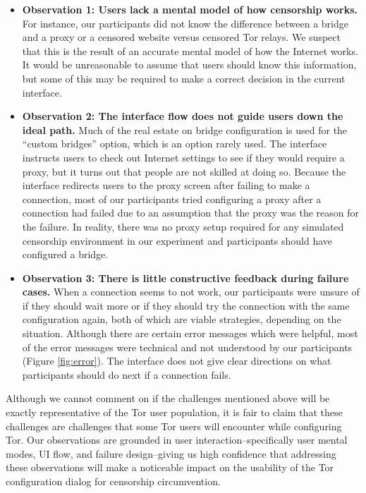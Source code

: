 \documentclass{template}
\begin{document}
\begin{itemize} \itemsep1pt \parskip0pt 
\item {\bfseries Observation 1: Users lack a mental model of how censorship works.} For instance, our participants did not know the difference between a bridge and a proxy or a censored website versus censored Tor relays. We suspect that this is the result of an accurate mental model of how the Internet works.  It would be unreasonable to assume that users should know this information, but some of this may be required to make a correct decision in the current interface. 
\item {\bfseries Observation 2: The interface flow does not guide users down the ideal path.} Much of the real estate on bridge configuration is used for the ``custom bridges'' option, which is an option rarely used. The interface instructs users to check out Internet settings to see if they would require a proxy, but it turns out that people are not skilled at doing so. Because the interface redirects users to the proxy screen after failing to make a connection, most of our participants tried configuring a proxy after a connection had failed due to an assumption that the proxy was the reason for the failure. In reality, there was no proxy setup required for any simulated censorship environment in our experiment and participants should have configured a bridge. 
\item {\bfseries Observation 3: There is little constructive feedback during failure cases.} When a connection seems to not work, our participants were unsure of if they should wait more or if they should try the connection with the same configuration again, both of which are viable strategies, depending on the situation. Although there are certain error messages which were helpful, most of the error messages were technical and not understood by our participants (Figure \ref{fig:error}). The interface does not give clear directions on what participants should do next if a connection fails. 
\end{itemize}

Although we cannot comment on if the challenges mentioned above will be exactly representative of the Tor user population, it is fair to claim that these challenges are challenges that some Tor users will encounter while configuring Tor. Our observations are grounded in user interaction--specifically user mental modes, UI flow, and failure design--giving us high confidence that addressing these observations will make a noticeable impact on the usability of the Tor configuration dialog for censorship circumvention. 
\end{document}
